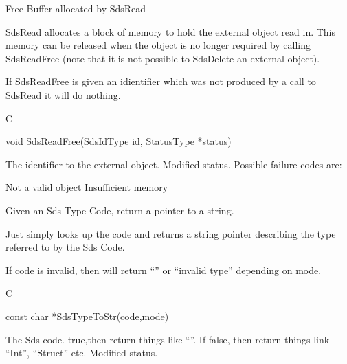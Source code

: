 \begin{manroutinedescription}
      Free Buffer allocated by SdsRead

      SdsRead allocates a block of memory to hold the external object read in.
      This memory can be released when the object is no longer required by %
calling
      SdsReadFree (note that it is not possible to SdsDelete an external %
object).

      If SdsReadFree is given an idientifier which was not produced by a call to
      SdsRead it will do nothing.
 
      C

      void SdsReadFree(SdsIdType id, StatusType *status)
 
\begin{manparametertable}
 The identifier to the external %
object.
 Modified status. Possible %
failure codes are:

\end{manparametertable}
\begin{mantwocolumntable}
Not a valid {} object
Insufficient memory
\end{mantwocolumntable}
\end{manroutinedescription}
\begin{manroutinedescription}
 	Given an Sds Type Code, return a pointer to a string.

 	Just simply looks up the code and returns a string pointer describing
 	the type referred to by the Sds Code.
 
 	If code is invalid, then will return ``{}'' or
 	``invalid type'' depending on mode.
 
      C

      const char *SdsTypeToStr(code,mode)
 
\begin{manparametertable}
 The Sds code.
  {} true,then return %
things like ``{}''.
      				If false, then return things link
      				``Int'', ``Struct'' etc.
 Modified status.

\end{manparametertable}
\end{manroutinedescription}
